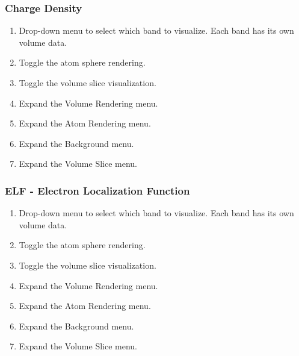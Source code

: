 \subsubsection{Charge Density}
\begin{enumerate}[label={(\arabic*)}]
  \item Drop-down menu to select which band to visualize. Each band has its own volume data.
  \item Toggle the atom sphere rendering.
  \item Toggle the volume slice visualization.
  \item Expand the Volume Rendering menu.
  \item Expand the Atom Rendering menu.
  \item Expand the Background menu.
  \item Expand the Volume Slice menu.
\end{enumerate}

\subsubsection{ELF - Electron Localization Function}
\begin{enumerate}[label={(\arabic*)}]
  \item Drop-down menu to select which band to visualize. Each band has its own volume data.
  \item Toggle the atom sphere rendering.
  \item Toggle the volume slice visualization.
  \item Expand the Volume Rendering menu.
  \item Expand the Atom Rendering menu.
  \item Expand the Background menu.
  \item Expand the Volume Slice menu.
\end{enumerate}


